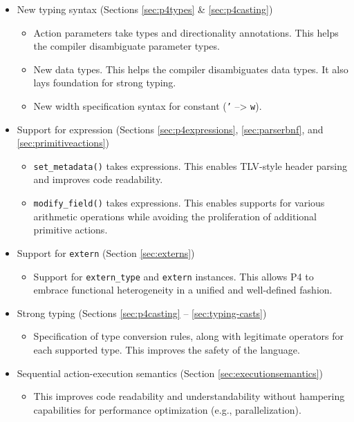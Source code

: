 \documentclass[12pt]{article}
\begin{document}

\begin{itemize}

\item New typing syntax (Sections \ref{sec:p4types} \& \ref{sec:p4casting})
  \begin{itemize}
  \item Action parameters take types and directionality annotations. 
  This helps the compiler disambiguate parameter types.
  \item New data types. This helps the compiler disambiguates data types. 
  It also lays foundation for strong typing.
  \item New width specification syntax for constant (\texttt{'} --> \texttt{w}).
  \end{itemize}

\item Support for expression (Sections \ref{sec:p4expressions}, 
\ref{sec:parserbnf}, and \ref{sec:primitiveactions})
  \begin{itemize}
  \item \texttt{set_metadata()} takes expressions. 
  This enables TLV-style header parsing and improves code readability.
  \item \texttt{modify_field()} takes expressions. 
  This enables supports for various arithmetic operations while avoiding
  the proliferation of additional primitive actions.
  \end{itemize}

\item Support for \texttt{extern} (Section \ref{sec:externs})
  \begin{itemize}
  \item Support for \texttt{extern_type} and \texttt{extern} instances.
  This allows P4 to embrace functional heterogeneity in a unified and well-defined
  fashion.
  \end{itemize}

\item Strong typing (Sections \ref{sec:p4casting} -- \ref{sec:typing-casts})
  \begin{itemize}
  \item Specification of type conversion rules, along with legitimate operators 
  for each supported type. This improves the safety of the language.
  \end{itemize}

\item Sequential action-execution semantics (Section \ref{sec:executionsemantics})
  \begin{itemize}
  \item This improves code readability and understandability without 
  hampering capabilities for performance optimization (e.g., parallelization).
  \end{itemize}


\end{itemize}
\end{document}
